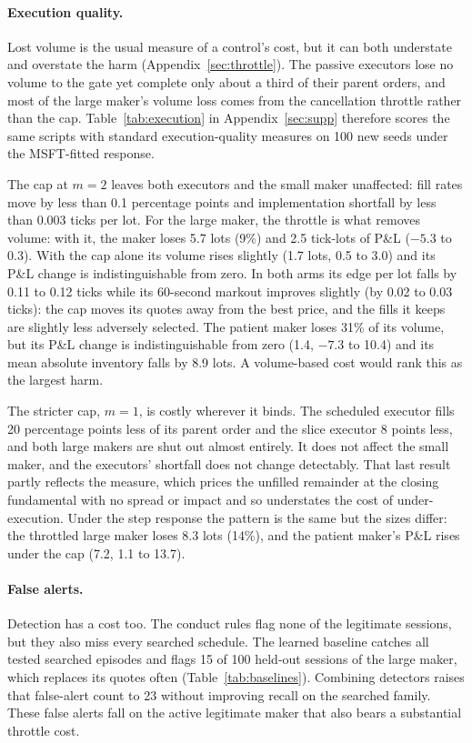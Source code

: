 \documentclass{article}
\begin{document}
\paragraph{Execution quality.} Lost volume is the usual measure of a control's cost, but it can both understate and overstate the harm (Appendix~\ref{sec:throttle}). The passive executors lose no volume to the gate yet complete only about a third of their parent orders, and most of the large maker's volume loss comes from the cancellation throttle rather than the cap. Table~\ref{tab:execution} in Appendix~\ref{sec:supp} therefore scores the same scripts with standard execution-quality measures on 100 new seeds under the MSFT-fitted response.

The cap at $m = 2$ leaves both executors and the small maker unaffected: fill rates move by less than 0.1 percentage points and implementation shortfall by less than 0.003 ticks per lot. For the large maker, the throttle is what removes volume: with it, the maker loses 5.7 lots (9\%) and 2.5 tick-lots of P\&L ($-5.3$ to 0.3). With the cap alone its volume rises slightly (1.7 lots, 0.5 to 3.0) and its P\&L change is indistinguishable from zero. In both arms its edge per lot falls by 0.11 to 0.12 ticks while its 60-second markout improves slightly (by 0.02 to 0.03 ticks): the cap moves its quotes away from the best price, and the fills it keeps are slightly less adversely selected. The patient maker loses 31\% of its volume, but its P\&L change is indistinguishable from zero (1.4, $-7.3$ to 10.4) and its mean absolute inventory falls by 8.9 lots. A volume-based cost would rank this as the largest harm.

The stricter cap, $m = 1$, is costly wherever it binds. The scheduled executor fills 20 percentage points less of its parent order and the slice executor 8 points less, and both large makers are shut out almost entirely. It does not affect the small maker, and the executors' shortfall does not change detectably. That last result partly reflects the measure, which prices the unfilled remainder at the closing fundamental with no spread or impact and so understates the cost of under-execution. Under the step response the pattern is the same but the sizes differ: the throttled large maker loses 8.3 lots (14\%), and the patient maker's P\&L rises under the cap (7.2, 1.1 to 13.7).

\paragraph{False alerts.} Detection has a cost too. The conduct rules flag none of the legitimate sessions, but they also miss every searched schedule. The learned baseline catches all tested searched episodes and flags 15 of 100 held-out sessions of the large maker, which replaces its quotes often (Table~\ref{tab:baselines}). Combining detectors raises that false-alert count to 23 without improving recall on the searched family. These false alerts fall on the active legitimate maker that also bears a substantial throttle cost.
\end{document}
